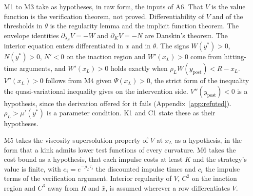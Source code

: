 M1 to M3 take as hypotheses, in raw form, the inputs of A6. That $V$ is the
value function is the verification theorem, not proved. Differentiability of
$V$ and of the thresholds in $\theta$ is the regularity lemma and the implicit
function theorem. The envelope identities $\partial_{\lambda_S}V=-W$ and
$\partial_KV=-N$ are Danskin's theorem. The interior equation enters
differentiated in $x$ and in $\theta$. The signs $W(y^*)>0$, $N(y^*)>0$,
$N'<0$ on the inaction region and $W'(x_L)>0$ come from hitting-time
arguments, and $W'(x_L)>0$ holds exactly when $\rho_LW(y_{\text{post}})<R-x_L$.
$V''(x_L)>0$ follows from M4 given $\Psi(x_L)>0$, the strict form of the
inequality the quasi-variational inequality gives on the intervention side.
$V''(y_{\text{post}})<0$ is a hypothesis, since the derivation offered for it
fails (Appendix~\ref{app:refuted}). $\rho_L>\mu'(y^*)$ is a parameter
condition. K1 and C1 state these as their hypotheses.

M5 takes the viscosity supersolution property of $V$ at $x_L$ as a
hypothesis, in the form that a kink admits lower test functions of every
curvature. M6 takes the cost bound as a hypothesis, that each impulse costs at
least $K$ and the strategy's value is finite, with $e_i=e^{-\rho_L\tau_i}$ the
discounted impulse times and $c_i$ the impulse terms of the verification
argument. Interior regularity of $V$, $C^2$ on the inaction region and $C^3$
away from $R$ and $\bar x$, is assumed wherever a row differentiates $V$.

